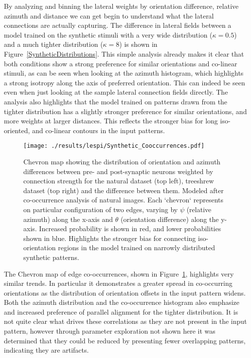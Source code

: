 By analyzing and binning the lateral weights by orientation
difference, relative azimuth and distance we can get begin to
understand what the lateral connections are actually capturing. The
difference in lateral fields between a model trained on the synthetic
stimuli with a very wide distribution ($\kappa=0.5$) and a much
tighter distribution ($\kappa=8$) is shown in
Figure~\ref{SyntheticDistributions}. This simple analysis already
makes it clear that both conditions show a strong preference for
similar orientations and co-linear stimuli, as can be seen when
looking at the azimuth histogram, which highlights a strong isotropy
along the axis of preferred orientation. This can indeed be seen even
when just looking at the sample lateral connection fields
directly. The analysis also highlights that the model trained on
patterns drawn from the tighter distribution has a slightly stronger
preference for similar orientations, and more weights at larger
distances. This reflects the stronger bias for long iso-oriented, and
co-linear contours in the input patterns.

\begin{figure}
	\centering
        \texttt{[image: ./results/lespi/Synthetic\_Cooccurrences.pdf]}
	\caption[Chevron map showing the distribution of orientation and
      azimuth differences between pre- and post-synaptic
      neurons.]{Chevron map showing the distribution of orientation
      and azimuth differences between pre- and post-synaptic neurons
      weighted by connection strength for the natural dataset (top
      left), treeshrew dataset (top right) and the difference between
      them. Modeled after \cite{Perrinet2015} co-occurrence analysis
      of natural images. Each `chevron` represents on particular
      configuration of two edges, varying by $\psi$ (relative azimuth)
      along the x-axis and $\theta$ (orientation difference) along the
      y-axis. Increased probability is shown in red, and lower
      probabilities shown in blue. Highlights the stronger bias for
      connecting iso-orientation regions in the model trained on
      narrowly distributed synthetic patterns.}
	\label{SyntheticCooccurrence}
\end{figure}

The Chevron map of edge co-occurrences, shown in
Figure~\ref{SyntheticCooccurrence}, highlights very similar trends. In
particular it demonstrates a greater spread in co-occurring
orientations as the distribution of orientation offsets in the input
pattern widens. Both the azimuth distribution and the co-occurrence
histogram also emphasize and increased preference of parallel
alignment for the tighter distribution. It is not quite clear what
drives these correlations as they are not present in the input
pattern, however through parameter exploration not shown here it was
determined that they could be reduced by presenting fewer overlapping
patterns, indicating they are artifacts.

